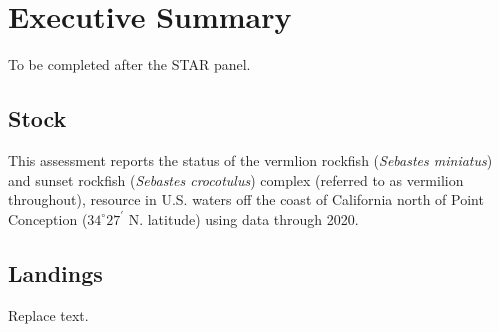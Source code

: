 \documentclass[11pt,
  english,
  a4paper,
]{article}
\begin{document}
\newcommand{\lt}{\ensuremath <}
\newcommand{\gt}{\ensuremath >}

\newcommand\CapeM{$40^\circ 10^\prime N$}
\newcommand\PtC{$34^\circ 27^\prime N$}
\newcommand\CAOR{$42^\circ 00^\prime N$}

\pagebreak
{}
\setcounter{page}{1}

\renewcommand{\thetable}{\roman{table}}
\renewcommand{\thefigure}{\roman{figure}}

\setlength\parskip{0.5em plus 0.1em minus 0.2em}


\hypertarget{executive-summary}{%
\section*{Executive Summary}\label{executive-summary}}

\leavevmode\tagmcend\tagstructend

To be completed after the STAR panel.


\hypertarget{stock}{%
\subsection*{Stock}\label{stock}}

\leavevmode\tagmcend\tagstructend

This assessment reports the status of the vermlion rockfish (\emph{Sebastes miniatus}) and sunset rockfish (\emph{Sebastes crocotulus}) complex (referred to as vermilion throughout), resource in U.S. waters off the coast of California north of Point Conception ({\(34^\circ 27^\prime\)\leavevmode\tagmcend\tagstructend} N. latitude) using data through 2020.


\hypertarget{landings}{%
\subsection*{Landings}\label{landings}}

\leavevmode\tagmcend\tagstructend

Replace text.

\end{document}
